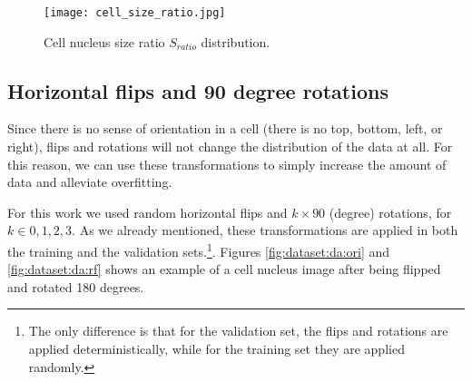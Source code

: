 \begin{figure}[htb]
  \centering
  \texttt{[image: cell\_size\_ratio.jpg]}
  \caption{Cell nucleus size ratio $S_{ratio}$ distribution.}
  \label{fig:dataset:da:cs_dist}
\end{figure}

\subsection{Horizontal flips and 90 degree rotations}

Since there is no sense of orientation in a cell (there is no top, bottom, left, or right), flips and rotations will not change the distribution of the data at all. For this reason, we can use these transformations to simply increase the amount of data and alleviate overfitting.

For this work we used random horizontal flips and $k\times90$ (degree) rotations, for $k\in{0, 1, 2, 3}$. As we already mentioned, these transformations are applied in both the training and the validation sets.\footnote{The only difference is that for the validation set, the flips and rotations are applied deterministically, while for the training set they are applied randomly.}. Figures \ref{fig:dataset:da:ori} and \ref{fig:dataset:da:rf} shows an example of a cell nucleus image after being flipped and rotated 180 degrees.

